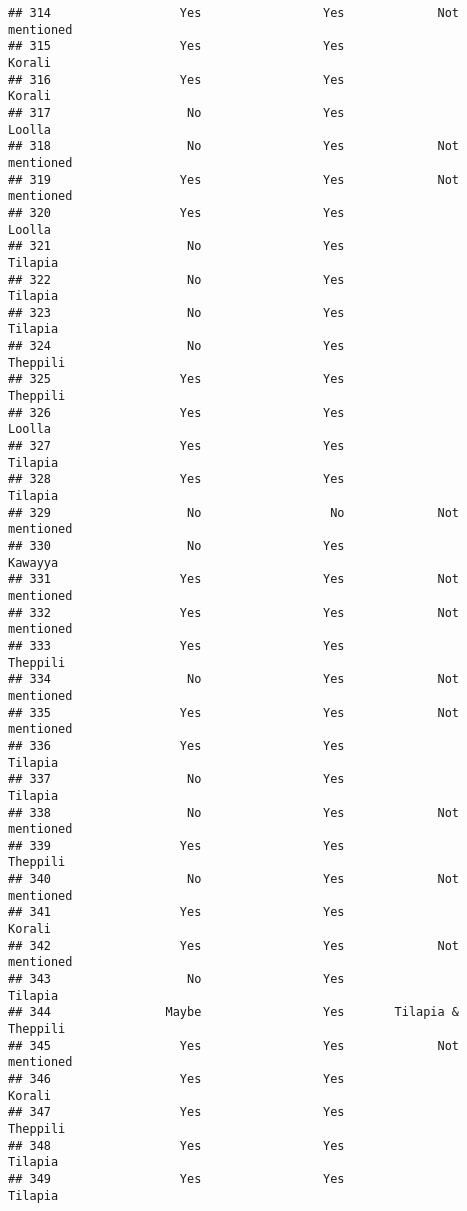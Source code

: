 \documentclass[
]{article}
\begin{document}
\begin{verbatim}
## 314                  Yes                 Yes             Not mentioned
## 315                  Yes                 Yes                   Korali 
## 316                  Yes                 Yes                   Korali 
## 317                   No                 Yes                   Loolla 
## 318                   No                 Yes             Not mentioned
## 319                  Yes                 Yes             Not mentioned
## 320                  Yes                 Yes                   Loolla 
## 321                   No                 Yes                  Tilapia 
## 322                   No                 Yes                  Tilapia 
## 323                   No                 Yes                  Tilapia 
## 324                   No                 Yes                 Theppili 
## 325                  Yes                 Yes                 Theppili 
## 326                  Yes                 Yes                   Loolla 
## 327                  Yes                 Yes                  Tilapia 
## 328                  Yes                 Yes                  Tilapia 
## 329                   No                  No             Not mentioned
## 330                   No                 Yes                  Kawayya 
## 331                  Yes                 Yes             Not mentioned
## 332                  Yes                 Yes             Not mentioned
## 333                  Yes                 Yes                 Theppili 
## 334                   No                 Yes             Not mentioned
## 335                  Yes                 Yes             Not mentioned
## 336                  Yes                 Yes                  Tilapia 
## 337                   No                 Yes                  Tilapia 
## 338                   No                 Yes             Not mentioned
## 339                  Yes                 Yes                 Theppili 
## 340                   No                 Yes             Not mentioned
## 341                  Yes                 Yes                   Korali 
## 342                  Yes                 Yes             Not mentioned
## 343                   No                 Yes                  Tilapia 
## 344                Maybe                 Yes       Tilapia & Theppili 
## 345                  Yes                 Yes             Not mentioned
## 346                  Yes                 Yes                   Korali 
## 347                  Yes                 Yes                 Theppili 
## 348                  Yes                 Yes                  Tilapia 
## 349                  Yes                 Yes                  Tilapia 

\end{verbatim}
\end{document}

